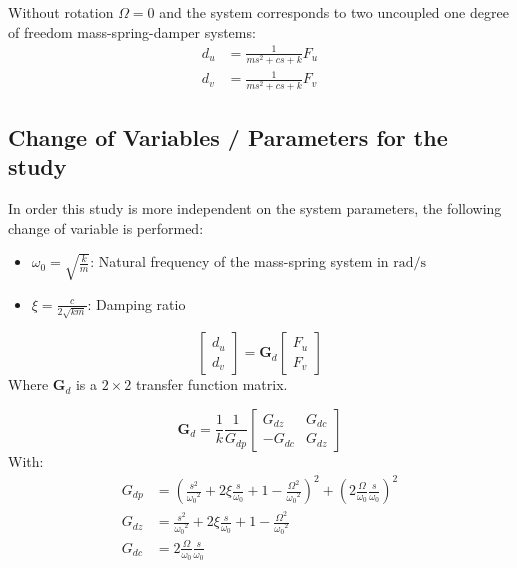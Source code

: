 \documentclass{ISMA_USD2020}
\begin{document}
Without rotation \(\Omega = 0\) and the system corresponds to two uncoupled one degree of freedom mass-spring-damper systems:
\begin{subequations}
\label{eq:oem_no_rotation}
  \begin{align}
    d_u &= \frac{1}{m s^2 + cs + k} F_u \\
    d_v &= \frac{1}{m s^2 + cs + k} F_v
  \end{align}
\end{subequations}

\subsection{Change of Variables / Parameters for the study}
\label{sec:orgb7d090c}

In order this study is more independent on the system parameters, the following change of variable is performed:
\begin{itemize}
\item \(\omega_0 = \sqrt{\frac{k}{m}}\): Natural frequency of the mass-spring system in \(\si{\radian/\s}\)
\item \(\xi = \frac{c}{2 \sqrt{k m}}\): Damping ratio
\end{itemize}

\begin{equation}
\label{eq:tf_d}
  \begin{bmatrix} d_u \\ d_v \end{bmatrix} = \bm{G}_d \begin{bmatrix} F_u \\ F_v \end{bmatrix}
\end{equation}
Where \(\bm{G}_d\) is a \(2 \times 2\) transfer function matrix.

\begin{equation}
\bm{G}_d = \frac{1}{k} \frac{1}{G_{dp}}
\begin{bmatrix}
   G_{dz} & G_{dc} \\
  -G_{dc} & G_{dz}
\end{bmatrix}
\end{equation}
With:
\begin{subequations}
  \begin{align}
    G_{dp} &= \left( \frac{s^2}{{\omega_0}^2} + 2 \xi \frac{s}{\omega_0} + 1 - \frac{{\Omega}^2}{{\omega_0}^2} \right)^2 + \left( 2 \frac{\Omega}{\omega_0} \frac{s}{\omega_0} \right)^2 \\
    G_{dz} &= \frac{s^2}{{\omega_0}^2} + 2 \xi \frac{s}{\omega_0} + 1 - \frac{{\Omega}^2}{{\omega_0}^2} \\
    G_{dc} &= 2 \frac{\Omega}{\omega_0} \frac{s}{\omega_0}
  \end{align}
\end{subequations}
\end{document}
